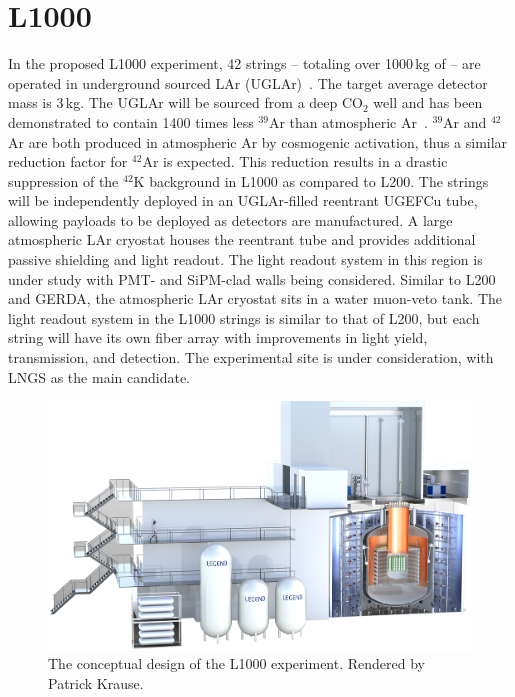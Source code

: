 \section{L1000}

In the proposed L1000 experiment, 42 strings -- totaling over 1000\,kg of \geEn{} -- are operated in underground sourced LAr (UGLAr)~\cite{legend_pcdr}. The target average detector mass is 3\,kg. The UGLAr will be sourced from a deep CO$_2$ well and has been demonstrated to contain 1400 times less $^{39}$Ar than atmospheric Ar~\cite{uglar}. $^{39}$Ar and $^{42}$Ar are both produced in atmospheric Ar by cosmogenic activation, thus a similar reduction factor for $^{42}$Ar is expected. This reduction results in a drastic suppression of the $^{42}$K background in L1000 as compared to L200. The strings will be independently deployed in an UGLAr-filled reentrant UGEFCu tube, allowing payloads to be deployed as detectors are manufactured. A large atmospheric LAr cryostat houses the reentrant tube and provides additional passive shielding and light readout. The light readout system in this region is under study with PMT- and SiPM-clad walls being considered.  Similar to L200 and GERDA, the atmospheric LAr cryostat sits in a water muon-veto tank. The light readout system in the L1000 strings is similar to that of L200, but each string will have its own fiber array with improvements in light yield, transmission, and detection. The experimental site is under consideration, with LNGS as the main candidate.
\begin{figure}[htb]
	\centering
	\includegraphics[width=6in]{figs/legend/L1000.png}
	\caption{The conceptual design of the L1000 experiment. Rendered by Patrick Krause.}
	\label{fig:legend1000}
\end{figure}

